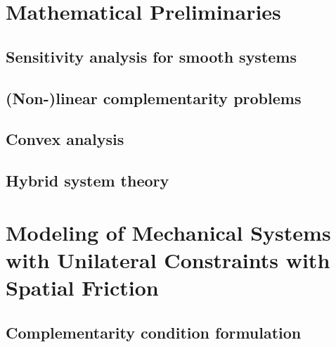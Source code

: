 \documentclass[DC2017114Bouma.tex]{subfiles}
\begin{document}
\graphicspath{{06_Appendices/img/}}
\appendix

\cleartooddpage
\chapter{Mathematical Preliminaries}
\section{Sensitivity analysis for smooth systems}
\section{(Non-)linear complementarity problems}
\section{Convex analysis}
\section{Hybrid system theory}

\cleartooddpage
\chapter{Modeling of Mechanical Systems with Unilateral Constraints with Spatial Friction}
\section{Complementarity condition formulation}
\end{document}
